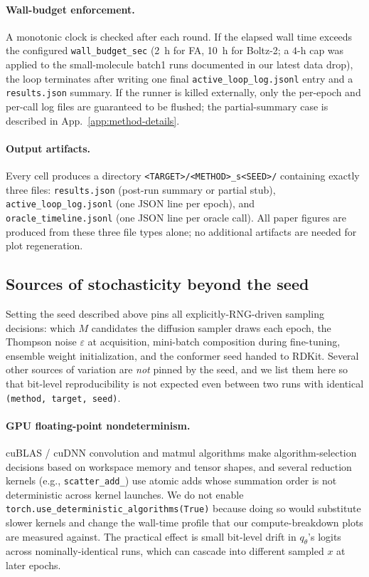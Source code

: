 \documentclass{article}
\begin{document}
\paragraph{Wall-budget enforcement.} A monotonic clock is checked after each round. If the elapsed wall time exceeds the configured \texttt{wall\_budget\_sec} (2~h for FA, 10~h for Boltz-2; a $4$-h cap was applied to the small-molecule batch1 runs documented in our latest data drop), the loop terminates after writing one final \texttt{active\_loop\_log.jsonl} entry and a \texttt{results.json} summary. If the runner is killed externally, only the per-epoch and per-call log files are guaranteed to be flushed; the partial-summary case is described in App.~\ref{app:method-details}.

\paragraph{Output artifacts.} Every cell produces a directory \texttt{<TARGET>/<METHOD>\_s<SEED>/} containing exactly three files: \texttt{results.json} (post-run summary or partial stub), \texttt{active\_loop\_log.jsonl} (one JSON line per epoch), and \texttt{oracle\_timeline.jsonl} (one JSON line per oracle call). All paper figures are produced from these three file types alone; no additional artifacts are needed for plot regeneration.

\subsection{Sources of stochasticity beyond the seed}\label{app:stochasticity}

Setting the seed described above pins all explicitly-RNG-driven sampling decisions: which $M$ candidates the diffusion sampler draws each epoch, the Thompson noise $\varepsilon$ at acquisition, mini-batch composition during fine-tuning, ensemble weight initialization, and the conformer seed handed to RDKit. Several other sources of variation are \emph{not} pinned by the seed, and we list them here so that bit-level reproducibility is not expected even between two runs with identical \texttt{(method, target, seed)}.

\paragraph{GPU floating-point nondeterminism.} cuBLAS / cuDNN convolution and matmul algorithms make algorithm-selection decisions based on workspace memory and tensor shapes, and several reduction kernels (e.g., \texttt{scatter\_add\_}) use atomic adds whose summation order is not deterministic across kernel launches. We do not enable \texttt{torch.use\_deterministic\_algorithms(True)} because doing so would substitute slower kernels and change the wall-time profile that our compute-breakdown plots are measured against. The practical effect is small bit-level drift in $q_\theta$'s logits across nominally-identical runs, which can cascade into different sampled $x$ at later epochs.
\end{document}
